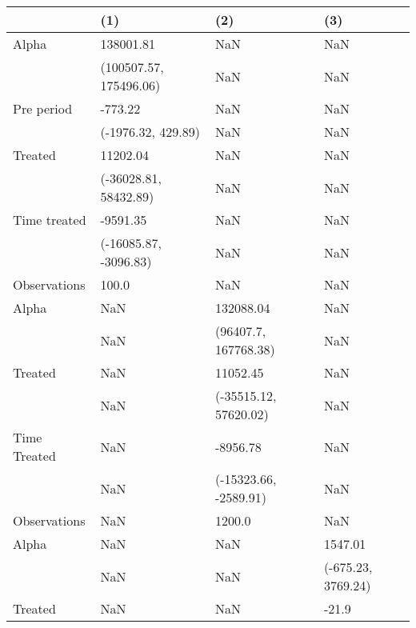 \begin{tabular}{llll}
\toprule
{} &                     (1) &                    (2) &                   (3) \\
\midrule
Alpha        &               138001.81 &                    NaN &                   NaN \\
             &  (100507.57, 175496.06) &                    NaN &                   NaN \\
Pre period   &                 -773.22 &                    NaN &                   NaN \\
             &      (-1976.32, 429.89) &                    NaN &                   NaN \\
Treated      &                11202.04 &                    NaN &                   NaN \\
             &   (-36028.81, 58432.89) &                    NaN &                   NaN \\
Time treated &                -9591.35 &                    NaN &                   NaN \\
             &   (-16085.87, -3096.83) &                    NaN &                   NaN \\
Observations &                   100.0 &                    NaN &                   NaN \\
Alpha        &                     NaN &              132088.04 &                   NaN \\
             &                     NaN &   (96407.7, 167768.38) &                   NaN \\
Treated      &                     NaN &               11052.45 &                   NaN \\
             &                     NaN &  (-35515.12, 57620.02) &                   NaN \\
Time Treated &                     NaN &               -8956.78 &                   NaN \\
             &                     NaN &  (-15323.66, -2589.91) &                   NaN \\
Observations &                     NaN &                 1200.0 &                   NaN \\
Alpha        &                     NaN &                    NaN &               1547.01 \\
             &                     NaN &                    NaN &    (-675.23, 3769.24) \\
Treated      &                     NaN &                    NaN &                 -21.9 \\

\end{tabular}

